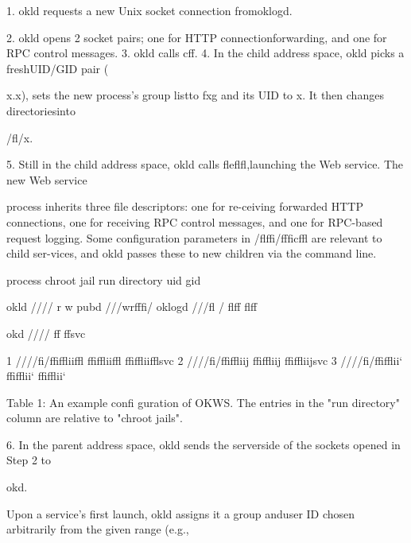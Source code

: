 1. okld requests a new Unix socket connection fromoklogd.

2. okld opens 2 socket pairs; one for HTTP connectionforwarding, and one for RPC control messages.
3. okld calls c\Xi \Theta ff.
4. In the child address space, okld picks a freshUID/GID pair (

x.x), sets the new process's group listto
fxg and its UID to x. It then changes directoriesinto

/\Pi \Xi \Theta fl\Delta /x.

5. Still in the child address space, okld calls flefl\Pi \Omega fl,launching the Web service. The new Web service

process inherits three file descriptors: one for re-ceiving forwarded HTTP connections, one for receiving RPC control messages, and one for RPC-based request logging. Some configuration parameters in /flffi\Pi /\Xi fffi\Delta  \Pi \Xi \Psi c\Phi ffl are relevant to child ser-vices, and okld passes these to new children via the
command line.

process chroot jail run directory uid gid

okld /\Gamma \Delta \Theta /\Lambda \Xi \Pi \Sigma /\Theta \Upsilon \Phi  / \Theta \Lambda \Lambda r \Pi w\Psi \Psi \Omega 
pubd /\Gamma \Delta \Theta /\Lambda \Xi \Pi \Sigma /wrff\Lambda fi\Sigma  / \Pi \Pi \Pi  \Pi \Pi \Pi 
oklogd /\Gamma \Delta \Theta /\Lambda \Xi \Pi \Sigma /\Omega \Lambda fl / \Lambda \Xi \Omega \Lambda flff \Lambda \Xi \Omega \Lambda flff

okd /\Gamma \Delta \Theta /\Lambda \Xi \Pi \Sigma /\Theta \Upsilon \Phi  / \Lambda \Xi ff \Lambda \Xi ffsvc

1 /\Gamma \Delta \Theta /\Lambda \Xi \Pi \Sigma /\Theta \Upsilon \Phi  /fi\Lambda \Theta \Psi \Sigma /ffiffliiffl ffiffliiffl ffiffliifflsvc
2 /\Gamma \Delta \Theta /\Lambda \Xi \Pi \Sigma /\Theta \Upsilon \Phi  /fi\Lambda \Theta \Psi \Sigma /ffiffliij ffiffliij ffiffliijsvc
3 /\Gamma \Delta \Theta /\Lambda \Xi \Pi \Sigma /\Theta \Upsilon \Phi  /fi\Lambda \Theta \Psi \Sigma /ffifflii` ffifflii` ffifflii`

Table 1: An example confi guration of OKWS. The entries in
the "run directory" column are relative to "chroot jails".

6. In the parent address space, okld sends the serverside of the sockets opened in Step 2 to

okd.

Upon a service's first launch, okld assigns it a group anduser ID chosen arbitrarily from the given range (e.g.,

